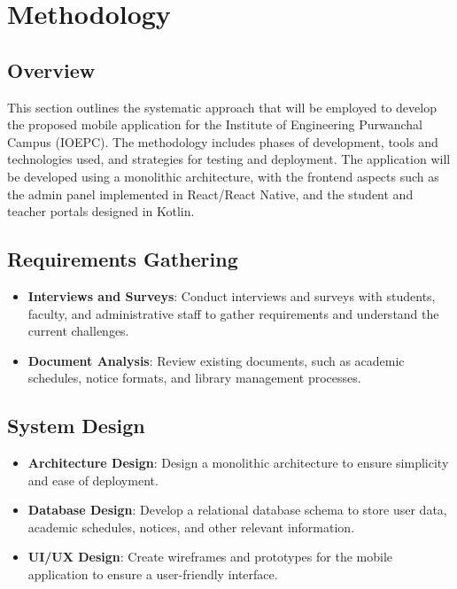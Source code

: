 \chapter{Methodology}

\section{Overview}
This section outlines the systematic approach that will be employed to develop the proposed mobile application for the Institute of Engineering Purwanchal Campus (IOEPC). The methodology includes phases of development, tools and technologies used, and strategies for testing and deployment. The application will be developed using a monolithic architecture, with the frontend aspects such as the admin panel implemented in React/React Native, and the student and teacher portals designed in Kotlin.

\section{Requirements Gathering}
\begin{itemize}
    \item \textbf{Interviews and Surveys}: Conduct interviews and surveys with students, faculty, and administrative staff to gather requirements and understand the current challenges.
    \item \textbf{Document Analysis}: Review existing documents, such as academic schedules, notice formats, and library management processes.
\end{itemize}

\section{System Design}
\begin{itemize}
    \item \textbf{Architecture Design}: Design a monolithic architecture to ensure simplicity and ease of deployment.
    \item \textbf{Database Design}: Develop a relational database schema to store user data, academic schedules, notices, and other relevant information.
    \item \textbf{UI/UX Design}: Create wireframes and prototypes for the mobile application to ensure a user-friendly interface.
\end{itemize}

